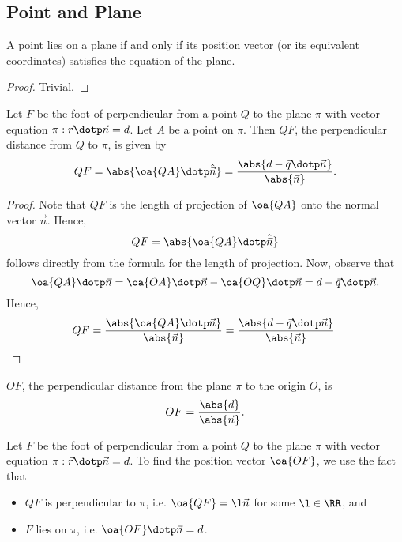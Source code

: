 \subsection{Point and Plane}

\begin{proposition}
    A point lies on a plane if and only if its position vector (or its equivalent coordinates) satisfies the equation of the plane.
\end{proposition}
\begin{proof}
    Trivial.
\end{proof}

\begin{proposition}
    Let $F$ be the foot of perpendicular from a point $Q$ to the plane $\pi$ with vector equation $\pi : \vec r \dotp \vec n = d$. Let $A$ be a point on $\pi$. Then $QF$, the perpendicular distance from $Q$ to $\pi$, is given by \[QF = \abs{\oa{QA} \dotp \hat{\vec n}} = \frac{\abs{d - \vec q \dotp \vec n}}{\abs{\vec n}}.\]
\end{proposition}
\begin{proof}
    Note that $QF$ is the length of projection of $\oa{QA}$ onto the normal vector $\vec n$. Hence, \[QF = \abs{\oa{QA} \dotp \hat{\vec n}}\] follows directly from the formula for the length of projection. Now, observe that \[\oa{QA} \dotp \vec n = \oa{OA} \dotp \vec n - \oa{OQ} \dotp \vec n = d - \vec q \dotp \vec n.\] Hence, \[QF = \frac{\abs{\oa{QA} \dotp \vec n}}{\abs{\vec n}} = \frac{\abs{d - \vec q \dotp \vec n}}{\abs{\vec n}}.\]
\end{proof}

\begin{corollary}
    $OF$, the perpendicular distance from the plane $\pi$ to the origin $O$, is \[OF = \frac{\abs{d}}{\abs{\vec n}}.\]
\end{corollary}

\begin{recipe}
    Let $F$ be the foot of perpendicular from a point $Q$ to the plane $\pi$ with vector equation $\pi : \vec r \dotp \vec n = d$. To find the position vector $\oa{OF}$, we use the fact that
    \begin{itemize}
        \item $QF$ is perpendicular to $\pi$, i.e. $\oa{QF} = \l \vec n$ for some $\l \in \RR$, and
        \item $F$ lies on $\pi$, i.e. $\oa{OF} \dotp \vec n = d$.
    \end{itemize}
\end{recipe}

